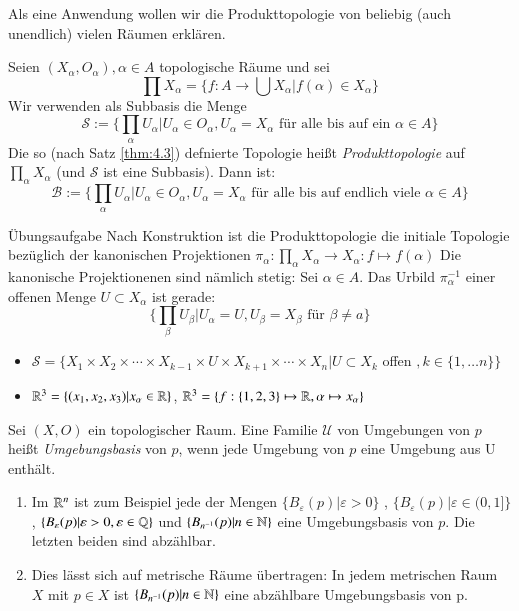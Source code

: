 \documentclass[a4paper,10pt]{scrartcl}
\newcommand{\eps}{\varepsilon}
\renewcommand{\bigsqcap}{\prod}
\begin{document}
Als eine Anwendung wollen wir die Produkttopologie von beliebig (auch unendlich) vielen Räumen erklären.

Seien $(X_\alpha,O_\alpha), \alpha \in A$ topologische Räume und sei
\[
 \bigsqcap X_\alpha=\{f:A\to\bigcup X_\alpha|f(\alpha)\in X_\alpha\}
\]
Wir verwenden als Subbasis die Menge
\[
 \mathcal S:=\{\bigsqcap_\alpha U_\alpha|U_\alpha \in O_\alpha, U_\alpha=X_\alpha \text{ für alle bis auf ein $\alpha \in A$}\}
\]
Die so (nach Satz \ref{thm:4.3}) defnierte Topologie heißt \emph{Produkttopologie} auf $\bigsqcap_\alpha X_\alpha$ (und 
$\mathcal S$ ist eine Subbasis). Dann ist:
\[
 \mathcal B := \{ \bigsqcap_\alpha U_\alpha|U_\alpha\in O_\alpha, U_\alpha=X_\alpha \text{ für alle bis auf endlich viele } \alpha \in A\}
\]
\begin{seg}{Übungsaufgabe}
 Nach Konstruktion ist die Produkttopologie die initiale Topologie bezüglich der kanonischen Projektionen $\pi_\alpha:\bigsqcap_\alpha X_\alpha\to X_\alpha: f\mapsto f(\alpha)$
Die kanonische Projektionenen sind nämlich stetig: Sei $\alpha \in A$. Das Urbild $\pi_\alpha^{-1}$ einer offenen Menge $U\subset X_\alpha$ ist gerade:
\[
 \{\bigsqcap_\beta U_\beta|U_\alpha=U, U_\beta=X_\beta \text{ für } \beta\neq a\}
\]

\end{seg}
\begin{note*}
 \begin{itemize}
  \item $\mathcal S=\{X_1\times X_2\times \dotsb  \times X_{k-1} \times U \times X_{k+1} \times\dotsb \times X_n |U\subset X_k$ offen $, k \in \{1, \dotsc n \} \} $
  \item $\mathbb{R}^3=\{(x_1,x_2,x_3)|x_\alpha\in \mathbb{R}\}$, $\mathbb{R}^3=\{f:\{1,2,3\}\mapsto \mathbb{R}, \alpha\mapsto x_\alpha\}$
 \end{itemize}
\end{note*}
\begin{df}
 Sei $(X,O)$ ein topologischer Raum. Eine Familie $\mathcal U$ von Umgebungen von $p$ heißt \emph{Umgebungsbasis} von $p$, wenn jede Umgebung von $p$ eine Umgebung aus U enthält.
\begin{figure}[H]
\centering
 \fixme[fig25]
\caption{}
\end{figure}
\end{df}
\begin{exs*}
 \begin{enumerate}
\item  Im $\mathbb{R}^n$ ist zum Beispiel jede der Mengen $\{B_\eps(p)|\eps>0\}$ , $ \{B_\eps(p)|\eps\in (0,1]\}$, $\{ B_\eps(p)|\eps>0,\eps\in \Q \}$ und $\{B_{n^{-1}}(p)|n\in \mathbb{N}\}$ eine Umgebungsbasis von $p$. Die letzten beiden sind abzählbar.
\item Dies lässt sich auf metrische Räume übertragen: In jedem metrischen Raum $X$ mit $p\in X$ ist $\{B_{n^{-1}}(p)|n\in \mathbb{N}\}$ eine abzählbare Umgebungsbasis von p.
 \end{enumerate}
\end{exs*}
\end{document}

